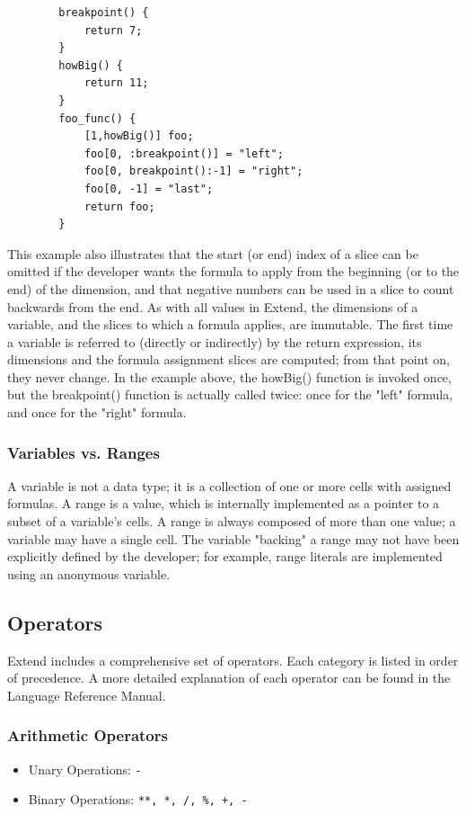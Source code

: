 	\begin{lstlisting}
		breakpoint() {
			return 7;
		}
		howBig() {
			return 11;
		}
		foo_func() {
			[1,howBig()] foo;
			foo[0, :breakpoint()] = "left";
			foo[0, breakpoint():-1] = "right";
			foo[0, -1] = "last";
			return foo;
		}
	\end{lstlisting}

	\medskip \noindent
	This example also illustrates that the start (or end) index of a slice can be omitted if the developer wants the formula to apply from the beginning (or to the end) of the dimension, and that negative numbers can be used in a slice to count backwards from the end. As with all values in Extend, the dimensions of a variable, and the slices to which a formula applies, are immutable. The first time a variable is referred to (directly or indirectly) by the return expression, its dimensions and the formula assignment slices are computed; from that point on, they never change. In the example above, the howBig() function is invoked once, but the breakpoint() function is actually called twice: once for the "left" formula, and once for the "right" formula.

	\subsubsection{Variables vs. Ranges}
	A variable is not a data type; it is a collection of one or more cells with assigned formulas. A range is a value, which is internally implemented as a pointer to a subset of a variable's cells. A range is always composed of more than one value; a variable may have a single cell. The variable "backing" a range may not have been explicitly defined by the developer; for example, range literals are implemented using an anonymous variable.

	\subsection{Operators}
	Extend includes a comprehensive set of operators. Each category is listed in order of precedence. A more detailed explanation of each operator can be found in the Language Reference Manual.

		\subsubsection{Arithmetic Operators}
			\begin{itemize}
				\item Unary Operations: \texttt{-}
				\item Binary Operations: \texttt{**, *, /, \%, +, -}
			\end{itemize}

